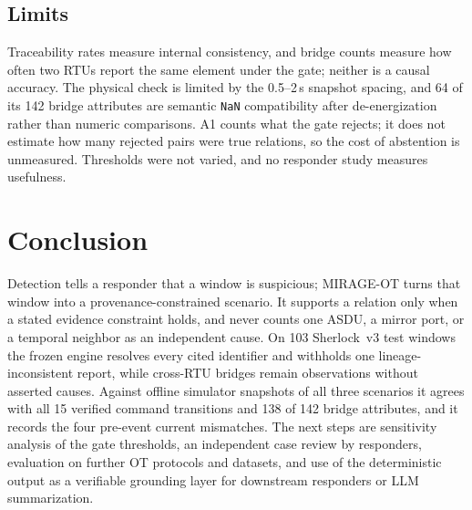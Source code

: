\documentclass[conference]{IEEEtran}
\begin{document}
\subsection{Limits}
Traceability rates measure internal consistency, and bridge counts measure how often two RTUs report the same element under the gate; neither is a causal accuracy.
The physical check is limited by the 0.5--2\,s snapshot spacing, and 64 of its 142 bridge attributes are semantic \texttt{NaN} compatibility after de-energization rather than numeric comparisons.
A1 counts what the gate rejects; it does not estimate how many rejected pairs were true relations, so the cost of abstention is unmeasured.
Thresholds were not varied, and no responder study measures usefulness.

\section{Conclusion}
Detection tells a responder that a window is suspicious; MIRAGE-OT turns that window into a provenance-constrained scenario.
It supports a relation only when a stated evidence constraint holds, and never counts one ASDU, a mirror port, or a temporal neighbor as an independent cause.
On 103 Sherlock~v3 test windows the frozen engine resolves every cited identifier and withholds one lineage-inconsistent report, while cross-RTU bridges remain observations without asserted causes.
Against offline simulator snapshots of all three scenarios it agrees with all 15 verified command transitions and 138 of 142 bridge attributes, and it records the four pre-event current mismatches.
The next steps are sensitivity analysis of the gate thresholds, an independent case review by responders, evaluation on further OT protocols and datasets, and use of the deterministic output as a verifiable grounding layer for downstream responders or LLM summarization.

\balance


\end{document}
